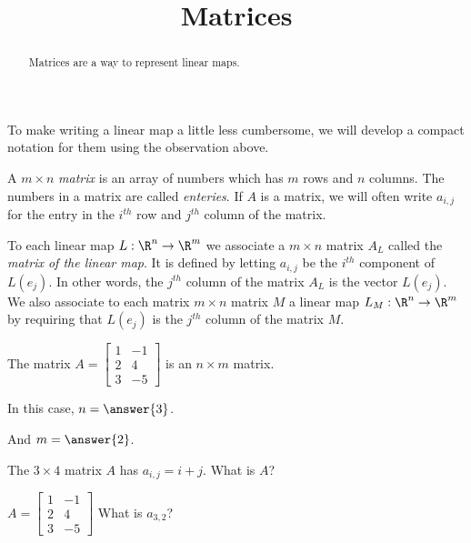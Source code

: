 \documentclass{article}
\title{Matrices}
\begin{document}
\begin{abstract}
  Matrices are a way to represent linear maps.
\end{abstract}

To make writing a linear map a little less cumbersome, we will develop a compact notation for them using the observation above. 
	
\begin{definition}
  A $m \times n$ \textit{matrix} is an array of numbers which has $m$ rows and $n$ columns.  The numbers in a matrix are called \textit{enteries}. If $A$ is a matrix, 
  we will often write $a_{i,j}$ for the entry in the $i^{th}$  row and $j^{th}$ column of the matrix.
\end{definition}

\begin{definition}
  To each linear map $L: \R^n \to \R^m$  we associate a $m \times n$ matrix $A_L$ called the \textit{matrix of the linear map}.  It is defined 
  by letting $a_{i,j}$ be the $i^{th}$ component of $L(e_j)$.  In other words, the $j^{th}$ column of the matrix $A_L$ is the vector $L(e_j)$.  We also associate to each 
  matrix $m \times n$ matrix $M$ a linear map $L_M: \R^n \to \R^m$ by requiring that $L(e_j)$ is the $j^{th}$ column of the matrix $M$. 
\end{definition}

\begin{question}
  The matrix $A = \begin{bmatrix}
    1&-1\\2&4\\3&-5
  \end{bmatrix}$
  is an $n \times m$ matrix.  

  \begin{solution}
    In this case, $n = \answer{3}$.

    And $m = \answer{2}$.
  \end{solution}
\end{question}
	
\begin{question}
  The $3 \times 4$ matrix $A$ has $a_{i,j} = i+j$.  What is $A$?
\end{question}

\begin{question}
  $A = \begin{bmatrix}
    1&-1\\2&4\\3&-5
  \end{bmatrix}$
  What is $a_{3,2}$?
\end{question}
\end{document}

